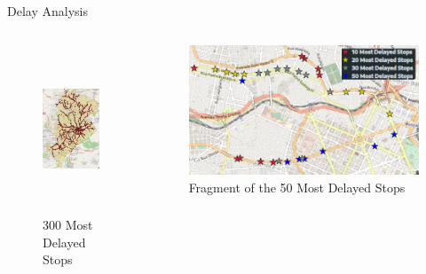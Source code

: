 \documentclass[xcolor=dvipsnames,table]{beamer}
\begin{document}
\begin{frame}{Delay Analysis}
        \begin{columns}
                \begin{figure}[H]
                        \centering
                        \caption{300 Most Delayed Stops}
                        \includegraphics[height=5cm, keepaspectratio]{images/mostDelayedStops.png}
                \end{figure}
                \begin{figure}[t]
                        \centering
                        \caption{Fragment of the 50 Most Delayed Stops }
                        \includegraphics[width=\linewidth]{images/10-50MostDelayedStops.png}
                \end{figure}
        \end{columns}
\end{frame}
\end{document}
